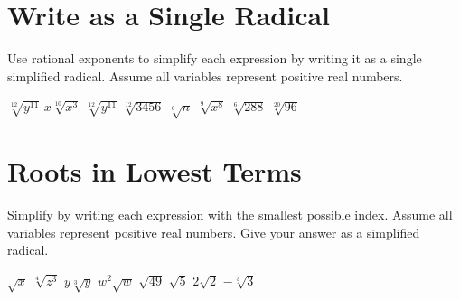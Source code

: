 \section*{Write as a Single Radical}
Use rational exponents to simplify each expression by writing it as a single simplified radical.  Assume all variables represent positive real numbers.
\begin{smenum}
\mitemxxxx
{$\sqrt[12]{y^{11}}$}
{$x\sqrt[10]{x^3}$}
{$\sqrt[12]{y^{11}}$}
{$\sqrt[12]{3456}$}
\mitemxxxx
{$\sqrt[6]{n}$}
{$\sqrt[9]{x^8}$}
{$\sqrt[6]{288}$}
{$\sqrt[20]{96}$}
\end{smenum}

\section*{Roots in Lowest Terms}
Simplify by writing each expression with the smallest possible index. Assume all variables represent positive real numbers. Give your answer as a simplified radical.
\begin{smenum}
\mitemxxxx
{$\sqrt{x}$}
{$\sqrt[4]{z^3}$}
{$y\sqrt[3]{y}$}
{$w^2\sqrt{w}$}
\mitemxxxx
{$\sqrt{49}$}
{$\sqrt{5}$}
{$2\sqrt{2}$}
{$-\sqrt[3]{3}$}
\end{smenum}

